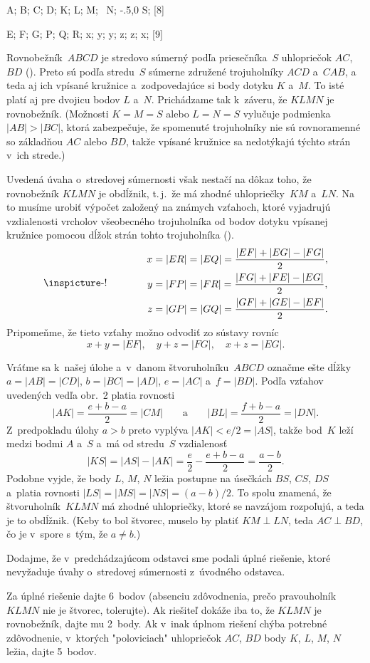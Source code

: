 {%
\fontplace
\tpoint A; \tpoint B; \bpoint C; \bpoint D;
\tpoint K; \tpoint L; \bpoint M; \bpoint\ N;
\tpoint\xy-.5,0 S;
[8] \hfil\Obr

\fontplace
\tpoint E; \tpoint F; \bpoint G;
\lBpoint P; \rBpoint Q; \tpoint R;
\tpoint x; \tpoint y; \lBpoint y; \lBpoint z;
\rBpoint z; \rBpoint x;
[9] \hfil\Obr

Rovnobežník~$ABCD$ je stredovo súmerný podľa priesečníka~$S$
uhlopriečok $AC$, $BD$ (\obr). Preto sú podľa stredu~$S$
súmerne združené trojuholníky $ACD$ a~$CAB$, a teda aj ich vpísané kružnice
\inspicture{}
a~zodpovedajúce si body dotyku $K$ a~$M$. To isté platí
aj pre dvojicu bodov $L$ a~$N$. Prichádzame tak k~záveru, že $KLMN$ je
rovnobežník. (Možnosti $K=M=S$ alebo $L=N=S$ vylučuje
podmienka $|AB|>|BC|$, ktorá zabezpečuje, že spomenuté trojuholníky nie sú
rovnoramenné so základňou $AC$ alebo $BD$, takže vpísané
kružnice sa nedotýkajú týchto strán v~ich strede.)

Uvedená úvaha o~stredovej súmernosti však nestačí na dôkaz
toho, že rovnobežník $KLMN$ je obdĺžnik, t.\,j.~že má zhodné
uhlopriečky~$KM$ a~$LN$. Na to musíme urobiť výpočet
založený na známych vzťahoch, ktoré vyjadrujú vzdialenosti vrcholov
všeobecného trojuholníka od bodov dotyku vpísanej kružnice pomocou dĺžok
strán tohto trojuholníka (\obr).
$$
\vcenter{\hbox{\inspicture-!}}\qquad\qquad
\aligned
x&=|ER|=|EQ|=\frac{|EF|+|EG|-|FG|}{2},\\
y&=|FP|=|FR|=\frac{|FG|+|FE|-|EG|}{2},\\
z&=|GP|=|GQ|=\frac{|GF|+|GE|-|EF|}{2}.
\endaligned
$$
Pripomeňme, že tieto vzťahy možno odvodiť zo sústavy rovníc
$$
x+y=|EF|,\quad y+z=|FG|,\quad x+z=|EG|.
$$

Vráťme sa k~našej úlohe a~v~danom štvoruholníku~$ABCD$ označme
ešte dĺžky $a=|AB|=|CD|$, $b=|BC|=|AD|$, $e=|AC|$ a~$f=|BD|$.
Podľa vzťahov uvedených vedľa obr.~2 platia rovnosti
$$
|AK|=\frac{e+b-a}{2}=|CM|\qquad\text{a}\qquad
|BL|=\frac{f+b-a}{2}=|DN|.
$$
Z~predpokladu úlohy $a>b$ preto vyplýva $|AK|<e/2=|AS|$,
takže bod~$K$ leží medzi bodmi $A$ a~$S$ a~má od stredu~$S$
vzdialenosť       %
$$
|KS|=|AS|-|AK|=\frac{e}{2}-\frac{e+b-a}{2}=\frac{a-b}{2}.
$$
Podobne vyjde, že body $L$, $M$, $N$ ležia postupne na úsečkách
$BS$, $CS$, $DS$ a~platia rovnosti $|LS|=|MS|=|NS|=(a-b)/2$.
To spolu znamená, že štvoruholník~$KLMN$ má zhodné uhlopriečky,
ktoré se navzájom rozpoľujú, a teda je to obdĺžnik. (Keby to bol
štvorec, muselo by platiť $KM\perp LN$, teda $AC\perp BD$, čo je
v~spore s~tým, že $a\ne b$.)

Dodajme, že v~predchádzajúcom odstavci sme podali úplné riešenie, ktoré
nevyžaduje úvahy o~stredovej súmernosti z~úvodného odstavca.


\nobreak\medskip\petit\noindent
Za úplné riešenie dajte 6~bodov (absenciu zdôvodnenia, prečo
pravouholník~$KLMN$ nie je štvorec, tolerujte). Ak riešiteľ dokáže iba to,
že $KLMN$ je rovnobežník, dajte mu 2~body. Ak v~inak
úplnom riešení chýba potrebné zdôvodnenie, v~ktorých "poloviciach"
uhlopriečok $AC$, $BD$ body $K$, $L$, $M$, $N$ ležia, dajte 5~bodov.

\endpetit
\bigbreak}

